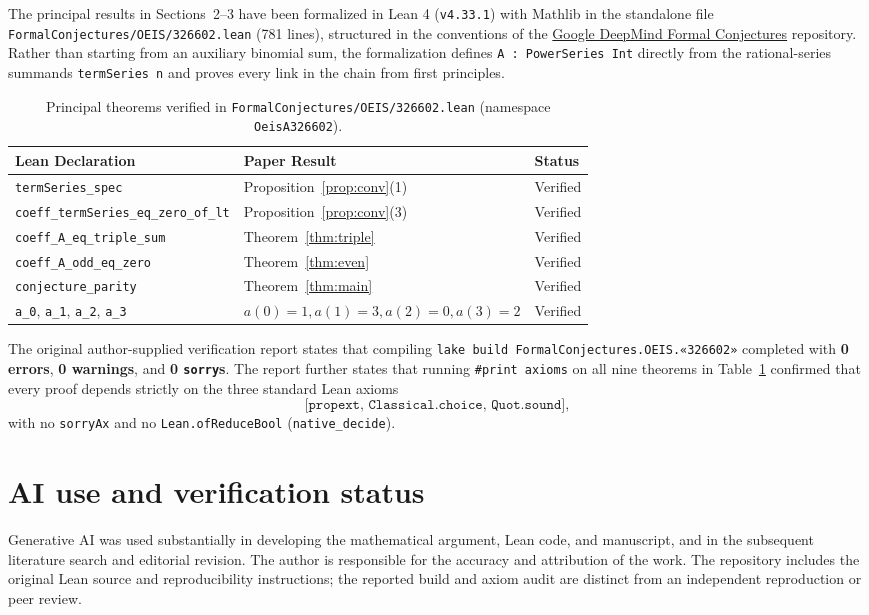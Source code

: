 \documentclass[11pt,a4paper]{article}
\theoremstyle{definition}
\theoremstyle{remark}
\begin{document}
The principal results in Sections~2--3 have been formalized in Lean 4 (\texttt{v4.33.1}) with Mathlib in the standalone file \texttt{FormalConjectures/OEIS/326602.lean} (781 lines), structured in the conventions of the \href{https://github.com/google-deepmind/formal-conjectures}{Google DeepMind Formal Conjectures} repository. Rather than starting from an auxiliary binomial sum, the formalization defines \texttt{A : PowerSeries Int} directly from the rational-series summands \texttt{termSeries n} and proves every link in the chain from first principles.

\begin{table}[ht]
\centering
\caption{Principal theorems verified in \texttt{FormalConjectures/OEIS/326602.lean} (namespace \texttt{OeisA326602}).}
\label{tab:lean}
\begin{tabular}{@{}lll@{}}
\toprule
Lean Declaration & Paper Result & Status \\
\midrule
\texttt{termSeries\_spec} & Proposition~\ref{prop:conv}(1) & Verified \\
\texttt{coeff\_termSeries\_eq\_zero\_of\_lt} & Proposition~\ref{prop:conv}(3) & Verified \\
\texttt{coeff\_A\_eq\_triple\_sum} & Theorem~\ref{thm:triple} & Verified \\
\texttt{coeff\_A\_odd\_eq\_zero} & Theorem~\ref{thm:even} & Verified \\
\texttt{conjecture\_parity} & Theorem~\ref{thm:main} & Verified \\
\texttt{a\_0}, \texttt{a\_1}, \texttt{a\_2}, \texttt{a\_3} & $a(0)=1, a(1)=3, a(2)=0, a(3)=2$ & Verified \\
\bottomrule
\end{tabular}
\end{table}

The original author-supplied verification report states that compiling \texttt{lake build FormalConjectures.OEIS.«326602»} completed with \textbf{0 errors}, \textbf{0 warnings}, and \textbf{0 \texttt{sorry}s}. The report further states that running \texttt{\#print axioms} on all nine theorems in Table~\ref{tab:lean} confirmed that every proof depends strictly on the three standard Lean axioms
\[
\texttt{[propext, Classical.choice, Quot.sound]},
\]
with no \texttt{sorryAx} and no \texttt{Lean.ofReduceBool} (\texttt{native\_decide}).

\section*{AI use and verification status}
Generative AI was used substantially in developing the mathematical argument, Lean code, and manuscript, and in the subsequent literature search and editorial revision. The author is responsible for the accuracy and attribution of the work. The repository includes the original Lean source and reproducibility instructions; the reported build and axiom audit are distinct from an independent reproduction or peer review.
\end{document}
